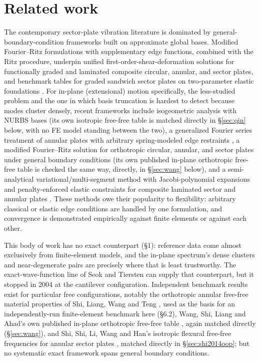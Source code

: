 \documentclass[11pt]{article}
\begin{document}
\section{Related work}
The contemporary sector-plate vibration literature is dominated by
general-boundary-condition frameworks built on approximate global bases.
Modified Fourier--Ritz formulations with supplementary edge functions,
combined with the Ritz procedure, underpin unified
first-order-shear-deformation solutions for functionally graded
\cite{wangfgm2016} and laminated composite \cite{wang2016} circular,
annular, and sector plates, and benchmark tables for graded sandwich
sector plates on two-parameter elastic foundations \cite{li2017fgm}. For
in-plane (extensional) motion specifically, the less-studied problem and
the one in which basis truncation is hardest to detect because modes
cluster densely, recent frameworks include isogeometric analysis with
NURBS bases \cite{qin2018} (its own isotropic free-free table is matched directly in \S\ref{sec:qin} below, with no FE model standing between the two), a
generalized Fourier series treatment of
annular plates with arbitrary spring-modeled edge restraints \cite{shi2014},
a modified Fourier--Ritz solution for orthotropic circular, annular, and
sector plates under general boundary conditions \cite{wangip2016} (its own
published in-plane orthotropic free-free table is checked the same way, directly, in \S\ref{sec:wang} below), and a
semi-analytical variational/multi-segment method with Jacobi-polynomial
expansions and penalty-enforced elastic constraints for composite laminated
sector and annular plates \cite{guan}. These methods owe their popularity to
flexibility: arbitrary classical or elastic edge conditions are handled by
one formulation, and convergence is demonstrated empirically against finite
elements or against each other.

This body of work has no exact counterpart (\S1): reference data come
almost exclusively from finite-element models, and the in-plane
spectrum's dense clusters and near-degenerate pairs are precisely where
that is least trustworthy. The exact-wave-function line of Seok and
Tiersten \cite{seok1,seok2,seok3,seok4} can supply that counterpart, but it
stopped in 2004 at the cantilever configuration. Independent benchmark
results exist for particular free configurations, notably the
orthotropic annular free-free material properties of Shi, Liang, Wang and Teng
\cite{shi2016}, used as the basis for an independently-run finite-element
benchmark here (\S6.2), Wang, Shi, Liang and Ahad's own published
in-plane orthotropic free-free table \cite{wangip2016}, again matched directly (\S\ref{sec:wang}), and Shi, Shi,
Li, Wang and Han's isotropic flexural free-free frequencies for annular
sector plates \cite{shi2014sector}, matched directly in
\S\ref{sec:shi2014oop}; but no systematic exact framework spans general
boundary conditions.
\end{document}
